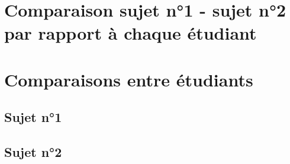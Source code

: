 \documentclass[12pt]{article}
\begin{document}
\section{Comparaison sujet n°1 - sujet n°2 par rapport à chaque étudiant}

\section{Comparaisons entre étudiants}
\subsection{Sujet n°1}

\subsection{Sujet n°2}
\end{document}
